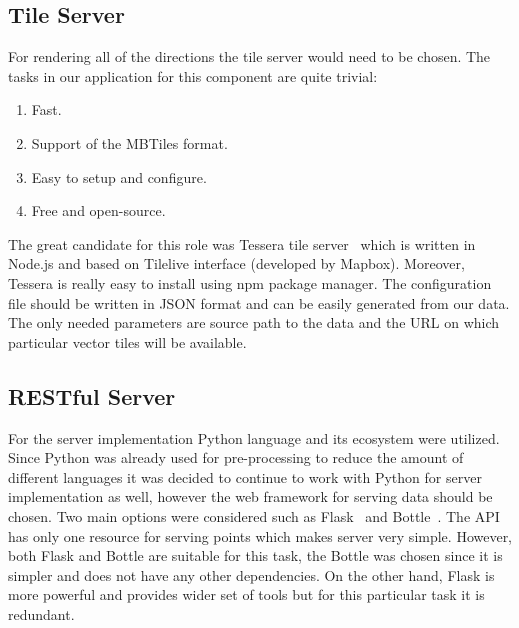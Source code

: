 \subsection{Tile Server}

For rendering all of the directions the tile server would need to be chosen. The tasks
in our application for this component are quite trivial:

\begin{enumerate}
  \item Fast.
  \item Support of the MBTiles format.
  \item Easy to setup and configure.
  \item Free and open-source.
\end{enumerate}

The great candidate for this role was Tessera tile server~\cite{gh:tessera} which is written in
Node.js and based on Tilelive interface (developed by Mapbox). Moreover, Tessera
is really easy to install using npm package manager. The configuration file should be
written in JSON format and can be easily generated from our data. The only needed parameters
are source path to the data and the URL on which particular vector tiles will be available.

\subsection{RESTful Server}

For the server implementation Python language and its ecosystem were utilized. Since Python was
already used for pre-processing to reduce the amount of different languages it was decided to
continue to work with Python for server implementation as well, however the web framework for
serving data should be chosen. Two main options were considered such as Flask~\cite{flask} and
Bottle~\cite{bottle}. The API has only one resource for serving points which makes server very
simple. However, both Flask and Bottle are suitable for this task, the Bottle was chosen since it is
simpler and does not have any other dependencies. On the other hand, Flask is more powerful and
provides wider set of tools but for this particular task it is redundant.
